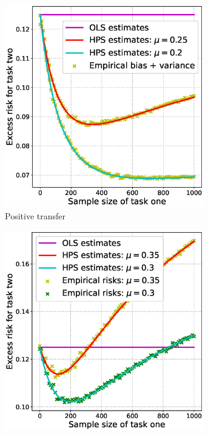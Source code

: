 \begin{figure}[!t]
	\begin{subfigure}[b]{0.33\textwidth}
		\centering
		\includegraphics[width=0.95\textwidth]{figures/model_shift_positive.eps}
		\caption{Positive transfer}
		\label{fig_sec3_model_positive}
	\end{subfigure}\hfill%
	\begin{subfigure}[b]{0.33\textwidth}
		\centering
		\includegraphics[width=0.95\textwidth]{figures/model_shift_transition.eps}

\end{subfigure}
\end{figure}
